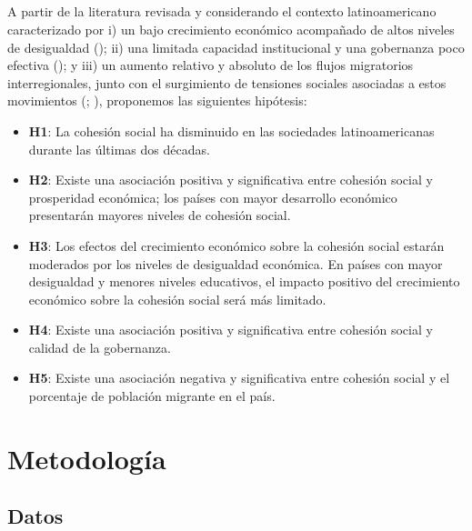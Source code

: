 \documentclass[
  letterpaper,
  DIV=11,
  numbers=noendperiod]{scrartcl}
\begin{document}
\subsection{}\label{section}

A partir de la literatura revisada y considerando el contexto
latinoamericano caracterizado por i) un bajo crecimiento económico
acompañado de altos niveles de desigualdad
(); ii) una limitada capacidad institucional y una gobernanza poco
efectiva
(); y iii) un aumento relativo y absoluto de los flujos migratorios
interregionales, junto con el surgimiento de tensiones sociales
asociadas a estos movimientos
(;
),
proponemos las siguientes hipótesis:

\begin{itemize}
\item
  \textbf{H1}: La cohesión social ha disminuido en las sociedades
  latinoamericanas durante las últimas dos décadas.
\item
  \textbf{H2}: Existe una asociación positiva y significativa entre
  cohesión social y prosperidad económica; los países con mayor
  desarrollo económico presentarán mayores niveles de cohesión social.
\item
  \textbf{H3}: Los efectos del crecimiento económico sobre la cohesión
  social estarán moderados por los niveles de desigualdad económica. En
  países con mayor desigualdad y menores niveles educativos, el impacto
  positivo del crecimiento económico sobre la cohesión social será más
  limitado.
\item
  \textbf{H4}: Existe una asociación positiva y significativa entre
  cohesión social y calidad de la gobernanza.
\item
  \textbf{H5}: Existe una asociación negativa y significativa entre
  cohesión social y el porcentaje de población migrante en el país.
\end{itemize}

\section{Metodología}\label{metodologuxeda}

\subsection{Datos}\label{datos}
\end{document}
